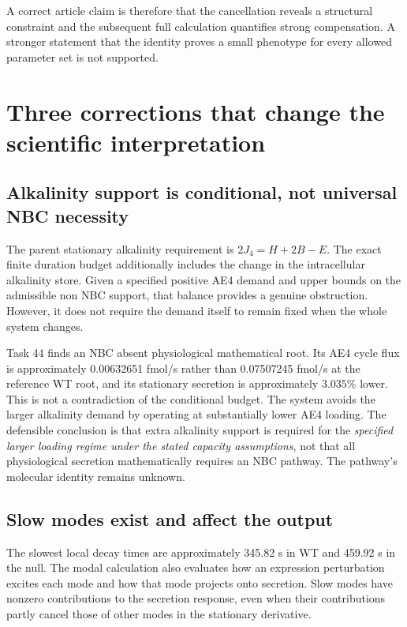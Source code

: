 A correct article claim is therefore that the cancellation reveals a structural constraint and the subsequent full calculation quantifies strong compensation. A stronger statement that the identity proves a small phenotype for every allowed parameter set is not supported.

\section{Three corrections that change the scientific interpretation}
\label{sec:report-corrections}
\subsection{Alkalinity support is conditional, not universal NBC necessity}
The parent stationary alkalinity requirement is $2J_4=H+2B-E$. The exact finite duration budget additionally includes the change in the intracellular alkalinity store. Given a specified positive AE4 demand and upper bounds on the admissible non NBC support, that balance provides a genuine obstruction. However, it does not require the demand itself to remain fixed when the whole system changes.

Task 44 finds an NBC absent physiological mathematical root. Its AE4 cycle flux is approximately 0.00632651 fmol/s rather than 0.07507245 fmol/s at the reference WT root, and its stationary secretion is approximately $3.035\%$ lower. This is not a contradiction of the conditional budget. The system avoids the larger alkalinity demand by operating at substantially lower AE4 loading. The defensible conclusion is that extra alkalinity support is required for the \emph{specified larger loading regime under the stated capacity assumptions}, not that all physiological secretion mathematically requires an NBC pathway. The pathway's molecular identity remains unknown.

\subsection{Slow modes exist and affect the output}
The slowest local decay times are approximately 345.82 s in WT and 459.92 s in the null. The modal calculation also evaluates how an expression perturbation excites each mode and how that mode projects onto secretion. Slow modes have nonzero contributions to the secretion response, even when their contributions partly cancel those of other modes in the stationary derivative.

